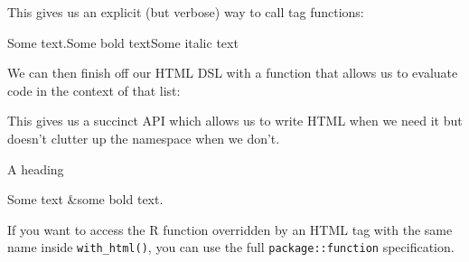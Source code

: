 This gives us an explicit (but verbose) way to call tag functions:

\begin{Shaded}
\begin{Highlighting}[]
\OperatorTok{$}\NormalTok{(}\OperatorTok{$}\NormalTok{(}\NormalTok{),}
\OperatorTok{$}\NormalTok{(}\NormalTok{))}
\end{Highlighting}
\end{Shaded}

Some text.Some bold textSome italic text

We can then finish off our HTML DSL with a function that allows us to
evaluate code in the context of that list:

\begin{Shaded}
\begin{Highlighting}[]
\StringTok{ }
  \NormalTok{(}
\NormalTok{\}}
\end{Highlighting}
\end{Shaded}

This gives us a succinct API which allows us to write HTML when we need
it but doesn't clutter up the namespace when we don't.

\begin{Shaded}
\begin{Highlighting}[]
\NormalTok{(}\NormalTok{(}
  \NormalTok{(}\NormalTok{, } \NormalTok{),}
  \NormalTok{(}\NormalTok{, }\NormalTok{(}\NormalTok{)),}
  \NormalTok{(} \NormalTok{, } \NormalTok{, } \NormalTok{)}
\NormalTok{))}
\end{Highlighting}
\end{Shaded}

A heading

Some text \&some bold text.

If you want to access the R function overridden by an HTML tag with the
same name inside \texttt{with\_html()}, you can use the full
\texttt{package::function} specification.


